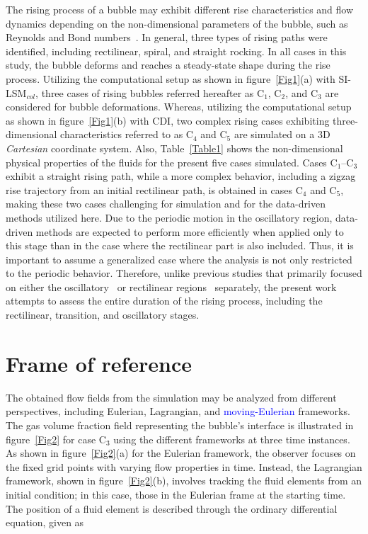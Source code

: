 \documentclass[a4paper,fleqn]{cas-sc}
\newcommand{\hl}[1]{\textcolor{blue}{#1}} %
\newcommand{\hl}[1]{#1} %
\begin{document}
	
	The rising process of a bubble may exhibit different rise characteristics and flow dynamics depending on the non-dimensional parameters of the bubble, such as Reynolds and Bond numbers~\cite{Cano-Lozano2016, Hua2007}. In general, three types of rising paths were identified, including rectilinear, spiral, and straight rocking. In all cases in this study, the bubble deforms and reaches a steady-state shape during the rise process. Utilizing the computational setup as shown in figure~\ref{Fig1}(a) with SI-LSM$_{col}$, three cases of rising bubbles referred hereafter as C$_1$, C$_2$, and C$_3$ are considered for bubble deformations. Whereas, utilizing the computational setup as shown in figure~\ref{Fig1}(b) with CDI, two complex rising cases exhibiting three-dimensional characteristics referred to as C$_4$ and C$_5$ are simulated on a 3D \textit{Cartesian} coordinate system. Also, Table~\ref{Table1} shows the non-dimensional physical properties of the fluids for the present five cases simulated. Cases C$_1$--C$_3$ exhibit a straight rising path, while a more complex behavior, including a zigzag rise trajectory from an initial rectilinear path, is obtained in cases C$_4$ and C$_5$, making these two cases challenging for simulation and for the data-driven methods utilized here. Due to the periodic motion in the oscillatory region, data-driven methods are expected to perform more efficiently when applied only to this stage than in the case where the rectilinear part is also included. Thus, it is important to assume a generalized case where the analysis is not only restricted to the periodic behavior. Therefore, unlike previous studies that primarily focused on either the oscillatory~\cite{Yin2023} or rectilinear regions~\cite{Yin2023a} separately, the present work attempts to assess the entire duration of the rising process, including the rectilinear, transition, and oscillatory stages. 
	
	\section{Frame of reference}
	\label{Framework}
	The obtained flow fields from the simulation may be analyzed from different perspectives, including Eulerian, Lagrangian, and \hl{moving-Eulerian} frameworks. The gas volume fraction field representing the bubble's interface is illustrated in figure~\ref{Fig2} for case C$_3$ using the different frameworks at three time instances. As shown in figure~\ref{Fig2}(a) for the Eulerian framework, the observer focuses on the fixed grid points with varying flow properties in time. Instead, the Lagrangian framework, shown in figure~\ref{Fig2}(b), involves tracking the fluid elements from an initial condition; in this case, those in the Eulerian frame at the starting time. The position of a fluid element is described through the ordinary differential equation, given as
	
\end{document}
